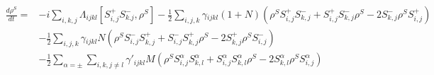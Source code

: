 \documentclass[aps,showpacs,twocolumn,twoside,groupedaddress]{revtex4}
\begin{document}
\begin{widetext}
\begin{equation}
\label{eq5}
\begin{split}
\frac{d\rho^{S}}{dt}=&-i\underset{i,k,j}{\sum}\Lambda_{ijkl}[S_{i,j}^{+}S_{k.j}^{-},\rho^{S}]-\frac{1}{2}\underset{i,j,k}{\sum}\gamma{}_{ijkl}(1+N)(\rho^{S}S_{i,j}^{+}S_{k,j}^{-}+S_{i,j}^{+}S_{k,j}^{-}\rho^{S}-2S_{k,j}^{-}\rho^{S}S_{i,j}^{+}) \\
& -\frac{1}{2}\underset{i,j,k}{\sum}\gamma{}_{ijkl}N(\rho^{S}S_{i,j}^{-}S_{k,j}^{+}+S_{i,j}^{-}S_{k,j}^{+}\rho^{S}-2S_{k,j}^{+}\rho^{S}S_{i,j}^{-})\\
& -\frac{1}{2}\sum_{\alpha=\pm}\underset{i,k,j\ne l}{\sum}\gamma'_{ijkl}M(\rho^{S}S_{i,j}^{\alpha}S_{k,l}^{\alpha}+S_{i,j}^{\alpha}S_{k,l}^{\alpha}\rho^{S}-2S_{k,l}^{\alpha}\rho^{S}S_{i,j}^{\alpha})
\end{split}
\end{equation}
\end{widetext}
\end{document}
